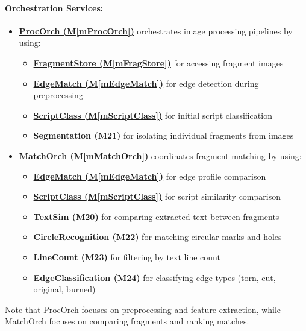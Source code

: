 \documentclass[12pt, titlepage]{article}
\newcommand{\mref}[1]{M\ref{#1}}
\begin{document}
\paragraph{Orchestration Services:}
\begin{itemize}
\item \hyperref[mProcOrch]{\textbf{ProcOrch (\mref{mProcOrch})}} orchestrates image processing pipelines by using:
  \begin{itemize}
  \item \hyperref[mFragStore]{\textbf{FragmentStore (\mref{mFragStore})}} for accessing fragment images
  \item \hyperref[mEdgeMatch]{\textbf{EdgeMatch (\mref{mEdgeMatch})}} for edge detection during preprocessing
  \item \hyperref[mScriptClass]{\textbf{ScriptClass (\mref{mScriptClass})}} for initial script classification
  \item \textbf{Segmentation (M21)} for isolating individual fragments from images
  \end{itemize}
\item \hyperref[mMatchOrch]{\textbf{MatchOrch (\mref{mMatchOrch})}} coordinates fragment matching by using:
  \begin{itemize}
  \item \hyperref[mEdgeMatch]{\textbf{EdgeMatch (\mref{mEdgeMatch})}} for edge profile comparison
  \item \hyperref[mScriptClass]{\textbf{ScriptClass (\mref{mScriptClass})}} for script similarity comparison
  \item \textbf{TextSim (M20)} for comparing extracted text between fragments
  \item \textbf{CircleRecognition (M22)} for matching circular marks and holes
  \item \textbf{LineCount (M23)} for filtering by text line count
  \item \textbf{EdgeClassification (M24)} for classifying edge types (torn, cut, original, burned)
  \end{itemize}
\end{itemize}

Note that ProcOrch focuses on preprocessing and feature extraction, while MatchOrch focuses on comparing fragments and ranking matches.
\end{document}
